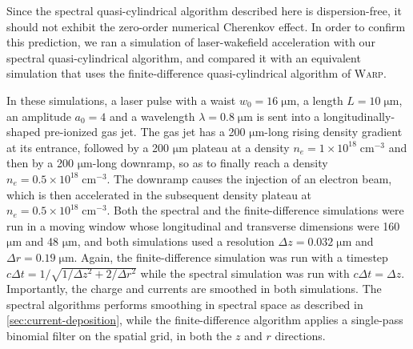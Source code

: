 \documentclass[1p,times,authoryear]{elsarticle}
\begin{document}
Since the spectral quasi-cylindrical algorithm described here is
dispersion-free, it should not exhibit the zero-order numerical Cherenkov
effect. In order to confirm this prediction, we ran a simulation of
laser-wakefield acceleration with our spectral quasi-cylindrical
algorithm, and compared it with an equivalent simulation that uses 
the finite-difference quasi-cylindrical algorithm of \textsc{Warp}.

In these simulations, a laser pulse with a waist $w_0 = 16\;\mathrm{\mu m}$,
a length $L=10\;\mathrm{\mu m}$, an amplitude $a_0 = 4$ and a
wavelength $\lambda = 0.8\;\mathrm{\mu m}$
is sent into a longitudinally-shaped pre-ionized gas jet. The gas jet
has a 200 $\mathrm{\mu m}$-long rising density gradient at its
entrance, followed by a 200 $\mathrm{\mu m}$ plateau at a density $n_e = 1 \times
 10^{18}\;\mathrm{cm^{-3}}$ and then by a 200 $\mathrm{\mu m}$-long
 downramp, so as to finally reach a density $n_e = 0.5 \times
 10^{18}\;\mathrm{cm^{-3}}$. The downramp causes the injection of an
 electron beam, which is then accelerated in the subsequent density 
plateau at $n_e = 0.5 \times 10^{18}\;\mathrm{cm^{-3}}$. 
Both the spectral and the finite-difference simulations were run in a moving
window whose longitudinal and transverse dimensions were 160 $\mathrm{\mu
  m}$ and 48 $\mathrm{\mu m}$, and both simulations used a resolution
$\Delta z = 0.032 \; \mathrm{\mu m}$ and $\Delta r = 0.19 \; \mathrm{\mu
  m}$. Again, the finite-difference simulation was run with a timestep
$c\Delta t = 1/\sqrt{1/\Delta z^2 + 2/\Delta r^2}$ while the spectral
simulation was run with $c\Delta t = \Delta z$. Importantly, the
charge and currents are smoothed in both
simulations. The spectral algorithms performs smoothing in spectral
space as described in \cref{sec:current-deposition}, while the finite-difference
algorithm applies a single-pass binomial filter on the spatial grid,
in both the $z$ and $r$ directions.
\end{document}
